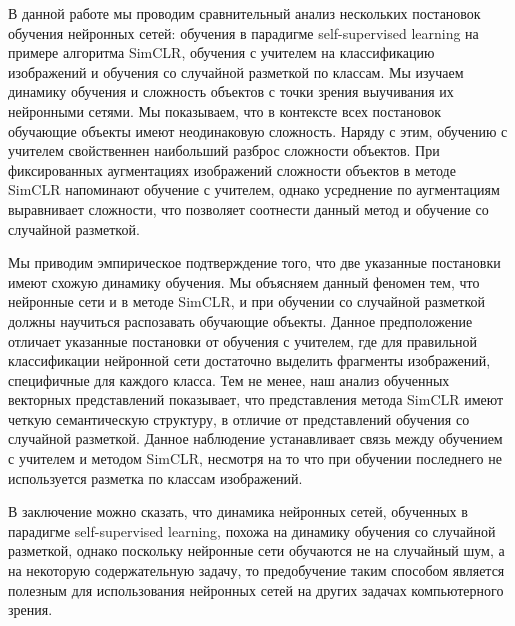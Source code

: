 В данной работе мы проводим сравнительный анализ нескольких постановок обучения нейронных сетей: обучения в парадигме self-supervised learning на примере алгоритма SimCLR, обучения с учителем на классификацию изображений и обучения со случайной разметкой по классам. Мы изучаем динамику обучения и сложность объектов с точки зрения выучивания их нейронными сетями. Мы показываем, что в контексте всех постановок обучающие объекты имеют неодинаковую сложность. Наряду с этим, обучению с учителем свойственнен наибольший разброс сложности объектов. При фиксированных аугментациях изображений сложности объектов в методе SimCLR напоминают обучение с учителем, однако усреднение по аугментациям выравнивает сложности, что позволяет соотнести данный метод и обучение со случайной разметкой.

Мы приводим эмпирическое подтверждение того, что две указанные постановки имеют схожую динамику обучения. Мы объясняем данный феномен тем, что нейронные сети и в методе SimCLR, и при обучении со случайной разметкой должны научиться распозавать обучающие объекты. Данное предположение отличает указанные постановки от обучения с учителем, где для правильной классификации нейронной сети достаточно выделить фрагменты изображений, специфичные для каждого класса. Тем не менее, наш анализ обученных векторных представлений показывает, что представления метода SimCLR имеют четкую семантическую структуру, в отличие от представлений обучения со случайной разметкой. Данное наблюдение устанавливает связь между обучением с учителем и методом SimCLR, несмотря на то что при обучении последнего не используется разметка по классам изображений.

В заключение можно сказать, что динамика нейронных сетей, обученных в парадигме self-supervised learning, похожа на динамику обучения со случайной разметкой, однако поскольку нейронные сети обучаются не на случайный шум, а на некоторую содержательную задачу, то предобучение таким способом является полезным для использования нейронных сетей на других задачах компьютерного зрения.
